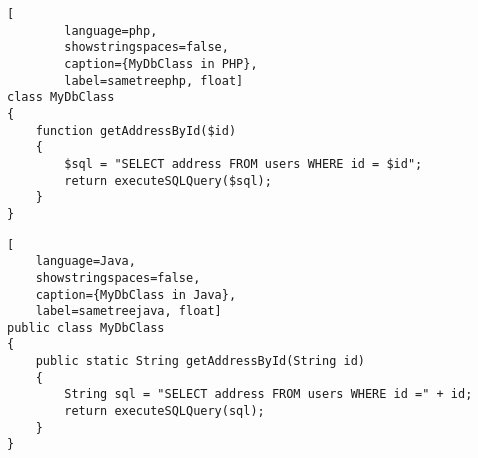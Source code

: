 \begin{lstlisting}[
        language=php,
        showstringspaces=false,
        caption={MyDbClass in PHP},
        label=sametreephp, float] 
class MyDbClass
{
    function getAddressById($id)
    {
        $sql = "SELECT address FROM users WHERE id = $id";
        return executeSQLQuery($sql);
    }
}
\end{lstlisting}
    
    
\begin{lstlisting}[
    language=Java,
    showstringspaces=false,
    caption={MyDbClass in Java},
    label=sametreejava, float]
public class MyDbClass
{
    public static String getAddressById(String id)
    {
        String sql = "SELECT address FROM users WHERE id =" + id;
        return executeSQLQuery(sql);
    }
}
\end{lstlisting}



